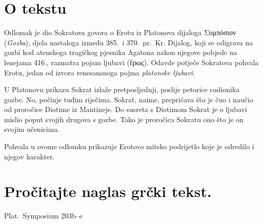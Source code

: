 


\section*{O tekstu}

Odlomak je dio Sokratova govora o Erotu iz Platonova dijaloga \textgreek[variant=ancient]{Συμπόσιον} (\textit{Gozba}), djela nastaloga između 385.\ i 370.\ pr.~Kr. Dijalog, koji se odigrava na gozbi kod atenskoga tragičkog pjesnika Agatona nakon njegove pobjede na lenejama 416., razmatra pojam ljubavi \textgreek[variant=ancient]{(ἔρως).} Odavde potječe Sokratova pohvala Erotu, jedan od izvora renesansnoga pojma \textit{platonske ljubavi.}

U Platonovu prikazu Sokrat izlaže pretposljednji, poslije petorice sudionika gozbe. No, počinje tuđim riječima. Sokrat, naime, prepričava što je čuo i naučio od proročice Diotime iz Mantineje. Do susreta s Diotimom Sokrat je o ljubavi mislio poput svojih drugova s gozbe. Tako je proročica Sokratu ono što je on svojim učenicima.

Pohvala u ovome odlomku prikazuje Erotovo mitsko podrijetlo koje je odredilo i njegov karakter.



\section*{Pročitajte naglas grčki tekst.}

Plat.\ Symposium 203b–e


\medskip


